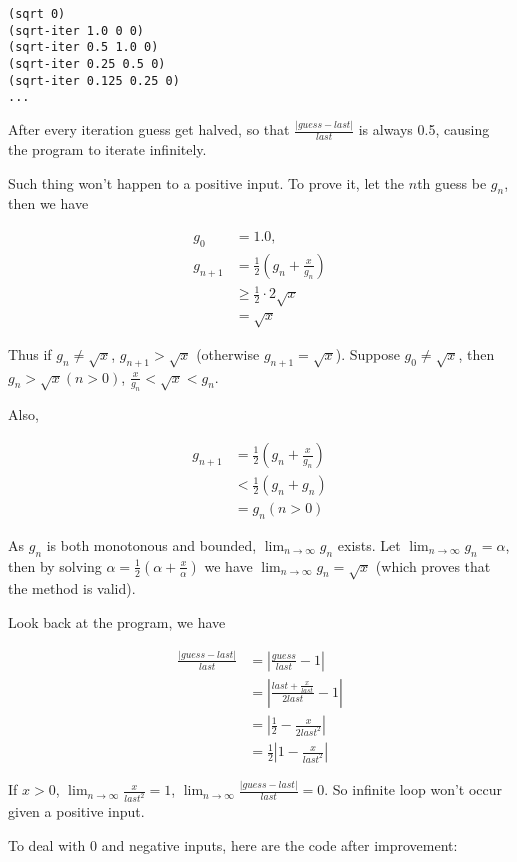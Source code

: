\documentclass[../main.tex]{subfiles}
\begin{document}
\begin{lstlisting}
(sqrt 0)
(sqrt-iter 1.0 0 0)
(sqrt-iter 0.5 1.0 0)
(sqrt-iter 0.25 0.5 0)
(sqrt-iter 0.125 0.25 0)
...
\end{lstlisting}

After every iteration guess get halved, so that
 $\frac{|guess-last|}{last}$ is always 0.5,
 causing the program to iterate infinitely.

Such thing won't happen to a positive input. To prove it, let
 the $n$th guess be $g_n$, then we have
 
\begin{align*}
g_0 &= 1.0, \\
g_{n+1} &= \frac{1}{2}(g_n+\frac{x}{g_n}) \\
&\geq \frac{1}{2}\cdot2\sqrt{x} \\
&= \sqrt{x}
\end{align*}

Thus if $g_n \neq \sqrt{x}$, $g_{n+1} > \sqrt{x}$ (otherwise $g_{n+1} = \sqrt{x}$).
 Suppose $g_0 \neq \sqrt{x}$, then $g_n > \sqrt{x} (n > 0)$, $\frac{x}{g_n} <
 \sqrt{x} < g_n$.

Also,

\begin{align*}
g_{n+1} &= \frac{1}{2}(g_n+\frac{x}{g_n}) \\
&< \frac{1}{2}(g_n+g_n) \\
&= g_n (n > 0)
\end{align*}

As $g_n$ is both monotonous and bounded, $\lim_{n \to \infty}g_n$ exists.
 Let $\lim_{n \to \infty}g_n = \alpha$, then by solving
 $\alpha = \frac{1}{2}(\alpha+\frac{x}{\alpha})$ we have
 $\lim_{n \to \infty}g_n = \sqrt{x}$ (which proves that the method is valid).

Look back at the program, we have

\begin{align*}
\frac{|guess-last|}{last} &= |\frac{guess}{last} - 1| \\
&= |\frac{last + \frac{x}{last}}{2 last} - 1| \\
&= |\frac{1}{2} - \frac{x}{2 last^2}| \\
&= \frac{1}{2}|1-\frac{x}{last^2}|
\end{align*}

If $x > 0$, $\lim_{n \to \infty}\frac{x}{last^2} = 1$, 
 $\lim_{n \to \infty}\frac{|guess-last|}{last} = 0$. So
 infinite loop won't occur given a positive input.

To deal with 0 and negative inputs, here are the code after
 improvement:
\end{document}
